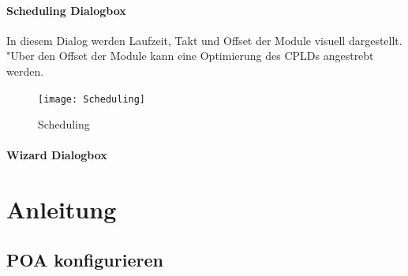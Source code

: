 \documentclass[a4paper,titlepage,12pt,ngerman]{scrbook}
\begin{document}
\subsubsection{Scheduling Dialogbox}
In diesem Dialog werden Laufzeit, Takt und Offset der Module visuell dargestellt. "Uber den Offset der Module kann eine Optimierung des CPLDs angestrebt werden.
\begin{figure}[htbp]
\begin{center}
\texttt{[image: Scheduling]}
\caption{Scheduling}\label{test}
\end{center}
\end{figure}

\subsubsection{Wizard Dialogbox}



\chapter{Anleitung}


\section{POA konfigurieren}
\end{document}
